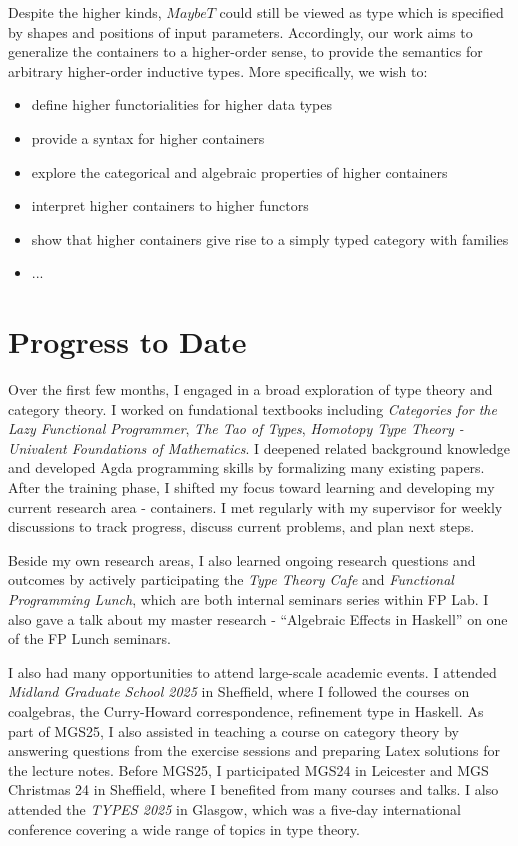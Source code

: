 Despite the higher kinds, $MaybeT$ could still be viewed as type which is specified by shapes and positions of input parameters. Accordingly, our work aims to generalize the containers to a higher-order sense, to provide the semantics for arbitrary higher-order inductive types. More specifically, we wish to:

\begin{itemize}
  \item{define higher functorialities for higher data types}
  \item{provide a syntax for higher containers}
  \item{explore the categorical and algebraic properties of higher containers}
  \item{interpret higher containers to higher functors}
  \item{show that higher containers give rise to a simply typed category with families}
  \item{...}
\end{itemize}

\section{Progress to Date}

Over the first few months, I engaged in a broad exploration of type theory and category theory. I worked on fundational textbooks including \textit{Categories for the Lazy Functional Programmer}\cite{altenkirch2024categories}, \textit{The Tao of Types}\cite{altenkirch2021types}, \textit{Homotopy Type Theory - Univalent Foundations of Mathematics}\cite{program2013homotopy}. I deepened related background knowledge and developed Agda programming skills by formalizing many existing papers. After the training phase, I shifted my focus toward learning and developing my current research area - containers. I met regularly with my supervisor for weekly discussions to track progress, discuss current problems, and plan next steps.

Beside my own research areas, I also learned ongoing research questions and outcomes by actively participating the \textit{Type Theory Cafe} and \textit{Functional Programming Lunch}, which are both internal seminars series within FP Lab. I also gave a talk about my master research - ``Algebraic Effects in Haskell'' on one of the FP Lunch seminars.

I also had many opportunities to attend large-scale academic events. I attended \textit{Midland Graduate School 2025} in Sheffield, where I followed the courses on coalgebras, the Curry-Howard correspondence, refinement type in Haskell. As part of MGS25, I also assisted in teaching a course on category theory by answering questions from the exercise sessions and preparing Latex solutions for the lecture notes. Before MGS25, I participated MGS24 in Leicester and MGS Christmas 24 in Sheffield, where I benefited from many courses and talks. I also attended the \textit{TYPES 2025} in Glasgow, which was a five-day international conference covering a wide range of topics in type theory.

